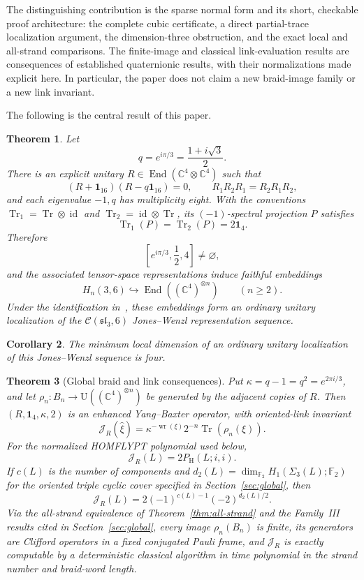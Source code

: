 \documentclass[11pt]{article}
\newtheorem{theorem}{Theorem}[section]
\newtheorem{corollary}[theorem]{Corollary}
\theoremstyle{remark}
\newcommand{\Id}{\mathbf 1}
\newcommand{\Tr}{\operatorname{Tr}}
\newcommand{\End}{\operatorname{End}}
\newcommand{\bbC}{\mathbb C}
\newcommand{\cC}{\mathcal C}
\begin{document}
The distinguishing contribution is the sparse normal form and its short,
checkable proof architecture: the complete cubic certificate, a direct
partial-trace localization argument, the dimension-three obstruction, and
the exact local and all-strand comparisons.  The finite-image and classical
link-evaluation results are consequences of established quaternionic results,
with their normalizations made explicit here.  In particular, the paper does
not claim a new braid-image family or a new link invariant.

The following is the central result of this paper.

\begin{theorem}\label{thm:main}
Let
\[
  q=e^{i\pi/3}=\frac{1+i\sqrt3}{2}.
\]
There is an explicit unitary \(R\in\End(\bbC^4\otimes\bbC^4)\) such that
\[
  (R+\Id_{16})(R-q\Id_{16})=0,\qquad
  R_1R_2R_1=R_2R_1R_2,
\]
and each eigenvalue \(-1,q\) has multiplicity eight.  With the conventions
\(\Tr_1=\Tr\otimes\operatorname{id}\) and
\(\Tr_2=\operatorname{id}\otimes\Tr\), its
\((-1)\)-spectral projection \(P\) satisfies
\[
  \Tr_1(P)=\Tr_2(P)=2\Id_4.
\]
Therefore
\[
  \left[e^{i\pi/3},\frac12,4\right]\ne\varnothing,
\]
and the associated tensor-space representations induce faithful
embeddings
\[
  H_n(3,6)\hookrightarrow\End\!\left((\bbC^4)^{\otimes n}\right)
  \qquad(n\ge2).
\]
Under the identification in~\cite[\S5.6]{GHR2013}, these embeddings form an
ordinary unitary localization of the
\(\cC(\mathfrak{sl}_3,6)\) Jones--Wenzl representation sequence.
\end{theorem}

\begin{corollary}\label{cor:minimal}
The minimum local dimension of an ordinary unitary localization of this
Jones--Wenzl sequence is four.
\end{corollary}

\begin{theorem}[Global braid and link consequences]\label{thm:global-summary}
Put \(\kappa=q-1=q^2=e^{2\pi i/3}\), and let
\(\rho_n:B_n\to\mathrm U((\bbC^4)^{\otimes n})\) be generated by the adjacent copies of
\(R\).  Then \((R,\Id_4,\kappa,2)\) is an enhanced Yang--Baxter operator, with
oriented-link invariant
\[
  \mathcal J_R(\widehat\xi)
  =\kappa^{-\operatorname{wr}(\xi)}2^{-n}\Tr(\rho_n(\xi)).
\]
For the normalized HOMFLYPT polynomial used below,
\[
  \mathcal J_R(L)=2P_{\mathrm H}(L;i,i).
\]
If \(c(L)\) is the number of components and
\(d_2(L)=\dim_{\mathbb F_2}H_1(\Sigma_3(L);\mathbb F_2)\) for the oriented
triple cyclic cover specified in Section~\ref{sec:global}, then
\[
  \mathcal J_R(L)=2(-1)^{c(L)-1}(-2)^{d_2(L)/2}.
\]
Via the all-strand equivalence of Theorem~\ref{thm:all-strand} and the
Family~III results cited in Section~\ref{sec:global}, every image
\(\rho_n(B_n)\) is finite, its generators are Clifford operators in a fixed
conjugated Pauli frame, and \(\mathcal J_R\) is exactly computable by a
deterministic classical algorithm in time polynomial in the strand number and
braid-word length.
\end{theorem}
\end{document}
